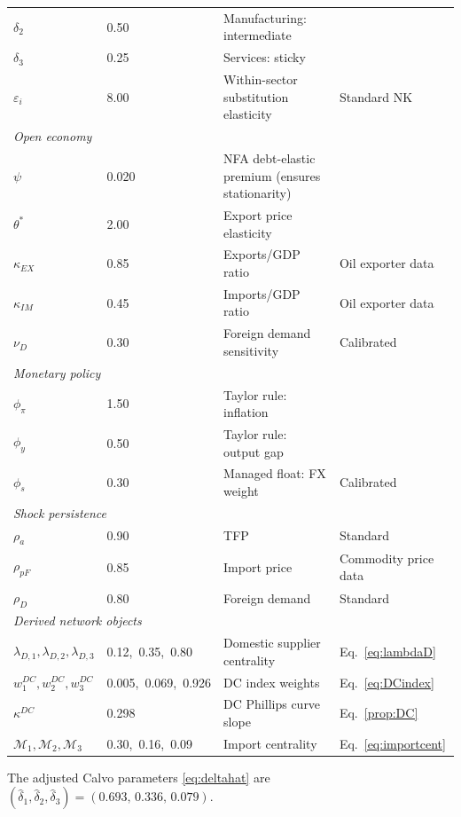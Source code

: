 \documentclass[11pt,a4paper]{article}
\newcommand{\wh}[1]{\widehat{#1}}
\begin{document}
\begin{table}[h!]
\begin{tabular}{llll}
$\delta_2$ & 0.50 & Manufacturing: intermediate & \citet{Pasten2017}\\
$\delta_3$ & 0.25 & Services: sticky & \citet{Pasten2017}\\
$\varepsilon_i$ & 8.00 & Within-sector substitution elasticity & Standard NK\\
\midrule
\multicolumn{4}{l}{\textit{Open economy}}\\
$\psi$ & 0.020 & NFA debt-elastic premium (ensures stationarity) & \citet{SGU2003}\\
$\theta^*$ & 2.00 & Export price elasticity & \citet{Gali2005}\\
$\kappa_{EX}$ & 0.85 & Exports/GDP ratio & Oil exporter data\\
$\kappa_{IM}$ & 0.45 & Imports/GDP ratio & Oil exporter data\\
$\nu_D$ & 0.30 & Foreign demand sensitivity & Calibrated\\
\midrule
\multicolumn{4}{l}{\textit{Monetary policy}}\\
$\phi_\pi$ & 1.50 & Taylor rule: inflation & \citet{Taylor1993}\\
$\phi_y$ & 0.50 & Taylor rule: output gap & \citet{Taylor1993}\\
$\phi_s$ & 0.30 & Managed float: FX weight & Calibrated\\
\midrule
\multicolumn{4}{l}{\textit{Shock persistence}}\\
$\rho_a$ & 0.90 & TFP & Standard\\
$\rho_{pF}$ & 0.85 & Import price & Commodity price data\\
$\rho_D$ & 0.80 & Foreign demand & Standard\\
\midrule
\multicolumn{4}{l}{\textit{Derived network objects}}\\
$\lambda_{D,1},\lambda_{D,2},\lambda_{D,3}$ & 0.12,\ 0.35,\ 0.80 & Domestic supplier centrality & Eq.~\eqref{eq:lambdaD}\\
$w^{DC}_1,w^{DC}_2,w^{DC}_3$ & 0.005,\ 0.069,\ 0.926 & DC index weights & Eq.~\eqref{eq:DCindex}\\
$\kappa^{DC}$ & 0.298 & DC Phillips curve slope & Eq.~\eqref{prop:DC}\\
$\mathcal{M}_1,\mathcal{M}_2,\mathcal{M}_3$ & 0.30,\ 0.16,\ 0.09 & Import centrality & Eq.~\eqref{eq:importcent}\\
\bottomrule
\end{tabular}
\end{table}

The adjusted Calvo parameters \eqref{eq:deltahat} are
$(\wh\delta_1,\wh\delta_2,\wh\delta_3)=(0.693,\,0.336,\,0.079)$.
\end{document}
